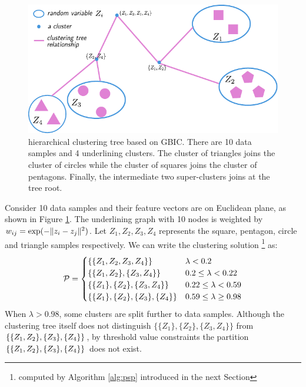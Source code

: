 \begin{example}
\begin{figure}
	\centering
	\includegraphics[width=\textwidth]{GBIC.pdf}
	\caption{hierarchical clustering tree based on GBIC. There are 10 data samples and 4 underlining clusters. The cluster of triangles joins the cluster of circles while the cluster of squares joins the cluster of pentagons. Finally, the intermediate two super-clusters joins at the tree root.}\label{fig:ta}
\end{figure}
Consider 10 data samples and their feature vectors are on Euclidean plane, as shown in Figure \ref{fig:ta}. The underlining graph with 10 nodes is weighted  by $w_{ij} = \exp(-\norm{z_i - z_j}^2)$. Let $Z_1, Z_2, Z_3, Z_4$ represents the square, pentagon, circle and triangle samples respectively. We can write the clustering solution \footnote{computed by Algorithm \ref{alg:psp} introduced in the next Section} as:
\begin{equation*}
\P = 
\begin{cases}
\{\{Z_1,Z_2,Z_3,Z_4\}\} & \lambda < 0.2 \\
\{\{Z_1,Z_2\},\{Z_3,Z_4\}\} & 0.2 \leq \lambda < 0.22 \\
\{\{Z_1\},\{Z_2\},\{Z_3,Z_4\}\} & 0.22 \leq \lambda < 0.59\\
\{\{Z_1\},\{Z_2\},\{Z_3\},\{Z_4\}\} & 0.59 \leq \lambda \geq 0.98
\end{cases}
\end{equation*}
When $\lambda > 0.98$, some clusters are split further to data samples.
Although the clustering tree itself does not distinguish
$\{\{Z_1\},\{Z_2\},\{Z_3,Z_4\}\}$ from $\{\{Z_1,Z_2\},\linebreak[2] \{Z_3\}, \{Z_4\}\}$,
by threshold value constraints the partition $\{\{Z_1,Z_2\} \linebreak[2] ,\{Z_3\}, \{Z_4\}\}$ does not exist.
\end{example}

